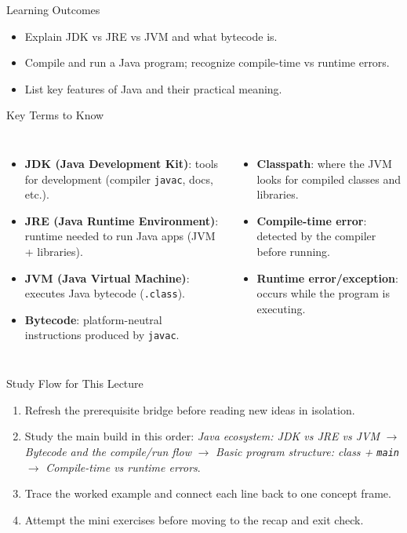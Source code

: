 \documentclass{beamer}
\begin{document}
\begin{frame}{Learning Outcomes}
  \begin{itemize}[<+->]
    \item Explain JDK vs JRE vs JVM and what bytecode is.
    \item Compile and run a Java program; recognize compile-time vs runtime errors.
    \item List key features of Java and their practical meaning.
  \end{itemize}
  \slidesources{\OOPSUnitISources}
\end{frame}

\begin{frame}{Key Terms to Know}
\small
\begin{columns}[t]
\begin{itemize}
  \item \textbf{JDK (Java Development Kit)}: tools for development (compiler \texttt{javac}, docs, etc.).
  \item \textbf{JRE (Java Runtime Environment)}: runtime needed to run Java apps (JVM + libraries).
  \item \textbf{JVM (Java Virtual Machine)}: executes Java bytecode (\texttt{.class}).
  \item \textbf{Bytecode}: platform-neutral instructions produced by \texttt{javac}.
\end{itemize}
\begin{itemize}
  \item \textbf{Classpath}: where the JVM looks for compiled classes and libraries.
  \item \textbf{Compile-time error}: detected by the compiler before running.
  \item \textbf{Runtime error/exception}: occurs while the program is executing.
\end{itemize}
\end{columns}
  \slidesources{\OOPSUnitISources}
\end{frame}

\begin{frame}{Study Flow for This Lecture}
\begin{enumerate}[<+->]
  \item Refresh the prerequisite bridge before reading new ideas in isolation.
  \item Study the main build in this order: \textit{Java ecosystem: JDK vs JRE vs JVM} $\rightarrow$ \textit{Bytecode and the compile/run flow} $\rightarrow$ \textit{Basic program structure: class + \texttt{main}} $\rightarrow$ \textit{Compile-time vs runtime errors}.
  \item Trace the worked example and connect each line back to one concept frame.
  \item Attempt the mini exercises before moving to the recap and exit check.
\end{enumerate}
  \slidesources{\OOPSUnitISources}
\end{frame}
\end{document}
